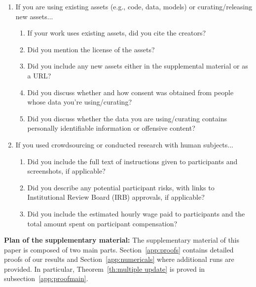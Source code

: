 \documentclass[11pt]{article}
\begin{document}
\begin{enumerate}
\item If you are using existing assets (e.g., code, data, models) or curating/releasing new assets...
\begin{enumerate}
  \item If your work uses existing assets, did you cite the creators?
    \answerYes{}
  \item Did you mention the license of the assets?
    \answerNo{}
  \item Did you include any new assets either in the supplemental material or as a URL?
    \answerNo{}
  \item Did you discuss whether and how consent was obtained from people whose data you're using/curating?
  \item Did you discuss whether the data you are using/curating contains personally identifiable information or offensive content?
    \answerNA{}
\end{enumerate}

\item If you used crowdsourcing or conducted research with human subjects...
\begin{enumerate}
  \item Did you include the full text of instructions given to participants and screenshots, if applicable?
    \answerNA{}
  \item Did you describe any potential participant risks, with links to Institutional Review Board (IRB) approvals, if applicable?
    \answerNA{}
  \item Did you include the estimated hourly wage paid to participants and the total amount spent on participant compensation?
    \answerNA{}
\end{enumerate}

\end{enumerate}


\clearpage

\appendix 



  \hsize\textwidth
  \linewidth{}
 
 \vspace{0.5in}
 
 
\textbf{Plan of the supplementary material:}
The supplementary material of this paper is composed of two main parts.
Section~\ref{app:proofs} contains detailed proofs of our results and Section~\ref{app:numericals} where additional runs are provided.
In particular, Theorem~\ref{th:multiple update} is proved in subsection~\ref{app:proofmain}.
\end{document}
